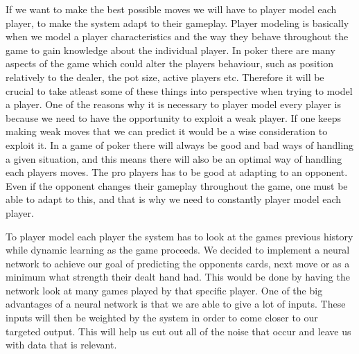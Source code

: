 If we want to make the best possible moves we will have to player model each player, to make the system adapt to their gameplay.
Player modeling is basically when we model a player characteristics and the way they behave throughout the game to gain knowledge about the individual player. 
In poker there are many aspects of the game which could alter the players behaviour, such as position relatively to the dealer, the pot size, active players etc. Therefore it will be crucial to take atleast some of these things into perspective when trying to model a player. One of the reasons why it is necessary to player model every player is because we need to have the opportunity to exploit a weak player. If one keeps making weak moves that we can predict it would be a wise consideration to exploit it.
In a game of poker there will always be good and bad ways of handling a given situation, and this means there will also be an optimal way of handling each players moves. 
The pro players has to be good at adapting to an opponent. Even if the opponent changes their gameplay throughout the game, one must be able to adapt to this, and that is why we need to constantly player model each player.

To player model each player the system has to look at the games previous history while dynamic learning as the game proceeds.
We decided to implement a neural network to achieve our goal of predicting the opponents cards, next move or as a minimum what strength their dealt hand had. This would be done by having the network look at many games played by that specific player.
One of the big advantages of a neural network is that we are able to give a lot of inputs. These inputs will then be weighted by the system in order to come closer to our targeted output.
This will help us cut out all of the noise that occur and leave us with data that is relevant.

